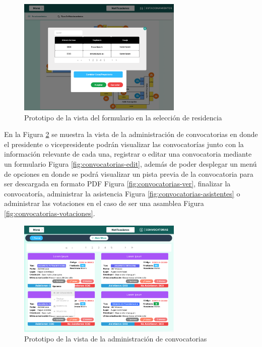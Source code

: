 \begin{figure}[H]
    \centering
    \includegraphics[width=0.7\textwidth]{resources/images/estacionamientos-form-vista}
    \caption{Prototipo de la vista del formulario en la selección de residencia}
    \label{fig:parqueaderos formulario seleccion residente}
\end{figure}

En la Figura \ref{fig:convocatorias} se muestra la vista de la administración de convocatorias en donde el presidente o vicepresidente podrán visualizar las convocatorías junto con la información relevante de cada una, registrar o editar una convocatoria mediante un formulario Figura \ref{fig:convocatorias-edit}, además de poder desplegar un menú de opciones en donde se podrá visualizar un pista previa de la convocatoria para ser descargada en formato PDF Figura \ref{fig:convocatorias-ver}, finalizar la convocatoría, administrar la asistencia Figura \ref{fig:convocatorias-asistentes} o administrar las votaciones en el caso de ser una asamblea Figura \ref{fig:convocatorias-votaciones}.

\begin{figure}[H]
    \centering
    \includegraphics[width=0.7\textwidth]{resources/images/convocatorias}
    \caption{Prototipo de la vista de la administración de convocatorias}
    \label{fig:convocatorias}
\end{figure}

